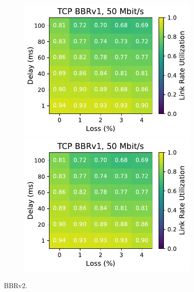 \begin{figure}[ht]
\begin{subfigure}[b]{0.89cm}
        \includegraphics[width=\linewidth,trim={8cm 0 0 0},clip]{splitting/figures/heatmaps/heatmap_tcp_bbr1_50mbps.pdf}
        \includegraphics[width=\linewidth,trim={8cm 0 0 0},clip]{splitting/figures/heatmaps/heatmap_tcp_bbr1_50mbps.pdf}
        \vspace*{0.2cm}
    \end{subfigure}
    \caption{BBRv2.}
\end{figure}

